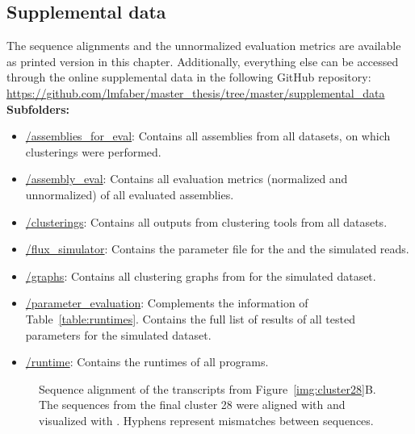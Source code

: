 \documentclass[12pt,a4paper,english]{article}
\begin{document}
\subsection{Supplemental data}
\label{appendix:supplements}
The sequence alignments and the unnormalized evaluation metrics are available as printed version in this chapter. Additionally, everything else can be accessed through the online supplemental data in the following GitHub repository:\\
\href{https://github.com/lmfaber/master_thesis/tree/master/supplemental_data}{https://github.com/lmfaber/master\_thesis/tree/master/supplemental\_data}\\
\textbf{Subfolders:}
\begin{itemize}
	\item \href{https://github.com/lmfaber/master_thesis/tree/master/supplemental_data/assemblies_for_eval}{/assemblies\_for\_eval}: Contains all assemblies from all datasets, on which clusterings were performed.
	\item \href{https://github.com/lmfaber/master_thesis/tree/master/supplemental_data/assembly_eval}{/assembly\_eval}: Contains all evaluation metrics (normalized and unnormalized) of all evaluated assemblies.
	\item \href{https://github.com/lmfaber/master_thesis/tree/master/supplemental_data/clusterings}{/clusterings}: Contains all outputs from clustering tools from all datasets.
	\item \href{https://github.com/lmfaber/master_thesis/tree/master/supplemental_data/flux_simulator}{/flux\_simulator}: Contains the parameter file for the \flux and the simulated reads.
	\item \href{https://github.com/lmfaber/master_thesis/tree/master/supplemental_data/graphs}{/graphs}: Contains all clustering graphs from \karma for the simulated \celegans dataset.
	\item \href{https://github.com/lmfaber/master_thesis/tree/master/supplemental_data/parameter\_evaluation}{/parameter\_evaluation}: Complements the information of Table~\ref{table:runtimes}. Contains the full list of results of all tested parameters for the simulated \celegans dataset.
	\item \href{https://github.com/lmfaber/master_thesis/tree/master/supplemental_data/runtime}{/runtime}: Contains the runtimes of all programs.


\end{itemize}


\begin{figure}
	\centering
	\def\svgwidth{\textwidth}
	
	\caption[Sequence alignment of the transcripts from Figure~\ref{img:cluster28}B.]{Sequence alignment of the transcripts from Figure~\ref{img:cluster28}B. The sequences from the final cluster 28 were aligned with \muscle \citep{muscle:04} and visualized with \jalview \citep{jalview:09}. Hyphens represent mismatches between sequences.}
	\label{img:aln:case1}
\end{figure}
\end{document}

